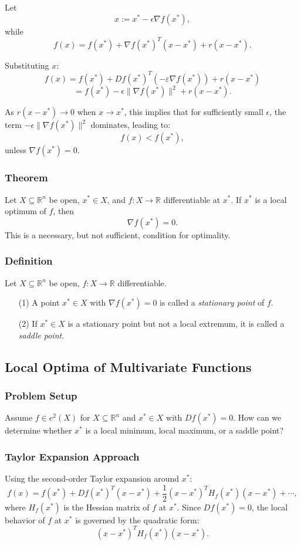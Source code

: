 \documentclass{article}
\begin{document}
Let 
\[ x := x^* - \epsilon \nabla f(x^*), \]
while 
\[ f(x) = f(x^*) + \nabla f(x^*)^T (x - x^*) + r(x - x^*). \]

Substituting \( x \):
\[ f(x) = f(x^*) + Df(x^*)^T (-\varepsilon \nabla f(x^*)) + r(x - x^*) \]
\[ = f(x^*) - \epsilon \| \nabla f(x^*) \|^2 + r(x - x^*). \]

As \( r(x - x^*) \to 0 \) when \( x \to x^* \), this implies that for sufficiently small \( \epsilon \), the term \( -\epsilon \| \nabla f(x^*) \|^2 \) dominates, leading to:
\[ f(x) < f(x^*), \]
unless \( \nabla f(x^*) = 0 \). 

\subsubsection*{Theorem}
Let \( X \subseteq \mathbb{R}^n \) be open, \( x^* \in X \), and \( f: X \to \mathbb{R} \) differentiable at \( x^* \). If \( x^* \) is a local optimum of \( f \), then 
\[ \nabla f(x^*) = 0. \]
This is a necessary, but not sufficient, condition for optimality.

\subsubsection*{Definition}
Let \( X \subseteq \mathbb{R}^n \) be open, \( f: X \to \mathbb{R} \) differentiable.

\begin{enumerate}
    \item[(1)] A point \( x^* \in X \) with \( \nabla f(x^*) = 0 \) is called a \textit{stationary point} of \( f \).

    \item[(2)] If \( x^* \in X \) is a stationary point but not a local extremum, it is called a \textit{saddle point}.
\end{enumerate}
\subsection{Local Optima of Multivariate Functions}
\subsubsection*{Problem Setup}
Assume \( f \in e^2(X) \) for \( X \subseteq \mathbb{R}^n \) and \( x^* \in X \) with \( Df(x^*) = 0 \). How can we determine whether \( x^* \) is a local minimum, local maximum, or a saddle point?

\subsubsection{Taylor Expansion Approach}
Using the second-order Taylor expansion around \( x^* \):
\[
f(x) = f(x^*) + Df(x^*)^T (x - x^*) + \frac{1}{2} (x - x^*)^T H_f(x^*) (x - x^*) + \cdots,
\]
where \( H_f(x^*) \) is the Hessian matrix of \( f \) at \( x^* \). Since \( Df(x^*) = 0 \), the local behavior of \( f \) at \( x^* \) is governed by the quadratic form:
\[
(x - x^*)^T H_f(x^*) (x - x^*).
\]
\end{document}
